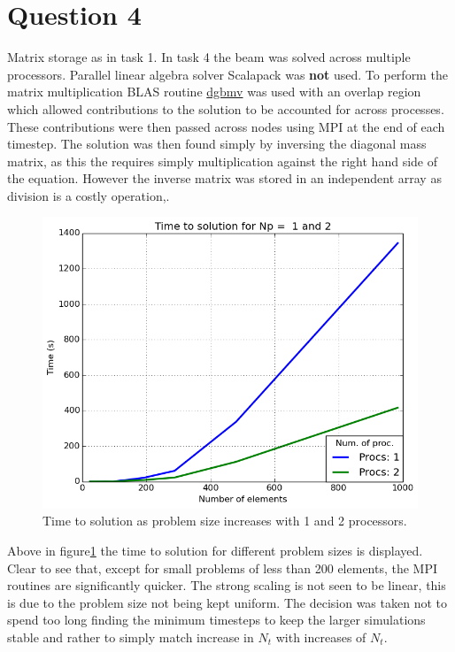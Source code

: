 \documentclass[10pt, a4paper]{article}
\begin{document}
\section*{Question 4}
Matrix storage as in task 1. In task 4 the beam was solved across multiple processors. Parallel linear algebra solver Scalapack\cite{scalapack1997} was \textbf{not} used. To perform the matrix multiplication BLAS routine \url{dgbmv} was used with an overlap region which allowed contributions to the solution to be accounted for across processes. These contributions were then passed across nodes using MPI\cite{MPI-2.2} at the end of each timestep. The solution was then found simply by inversing the diagonal mass matrix, as this the requires simply multiplication against the right hand side of the equation. However the inverse matrix was stored in an independent array as division is a costly operation,.

\begin{figure}[!htb]
  \centering
	  \includegraphics[width=.5\linewidth, clip=true, trim=0cm 0cm 0cm 0cm]{task4_timing}
  \caption{Time to solution as problem size increases with 1 and 2 processors.}
  \label{fig:timing4}
\end{figure}%
\noindent
Above in figure\ref{fig:timing4} the time to solution for different problem sizes is displayed. Clear to see that, except for small problems of less than 200 elements, the MPI routines are significantly quicker. The strong scaling is not seen to be linear, this is due to the problem size not being kept uniform. The decision was taken not to spend too long finding the minimum timesteps to keep the larger simulations stable and rather to simply match increase in $N_t$ with increases of $N_t$.
\end{document}
